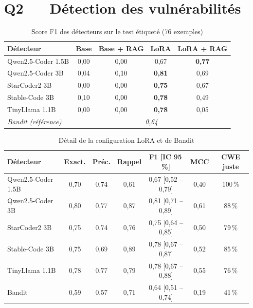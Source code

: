 \documentclass[11pt,a4paper,oneside]{report}
\begin{document}
\section{Q2 — Détection des vulnérabilités}
\begin{table}[H]
\centering
\caption{Score F1 des détecteurs sur le test étiqueté (76 exemples)}
\label{tab:f1}
\begin{tabular}{@{}lcccc@{}}
\toprule
\textbf{Détecteur} & \textbf{Base} & \textbf{Base + RAG} & \textbf{LoRA} & \textbf{LoRA + RAG} \\
\midrule
Qwen2.5-Coder 1.5B & 0,00 & 0,00 & 0,67 & \textbf{0,77} \\
Qwen2.5-Coder 3B & 0,04 & 0,10 & \textbf{0,81} & 0,69 \\
StarCoder2 3B & 0,00 & 0,00 & \textbf{0,75} & 0,67 \\
Stable-Code 3B & 0,10 & 0,00 & \textbf{0,78} & 0,49 \\
TinyLlama 1.1B & 0,00 & 0,00 & \textbf{0,78} & 0,05 \\
\midrule
\textit{Bandit (référence)} & \multicolumn{4}{c}{\textit{0,64}} \\
\bottomrule
\end{tabular}
\end{table}

\begin{table}[H]
\centering
\caption{Détail de la configuration LoRA et de Bandit}
\label{tab:lora}
\small
\begin{tabular}{@{}lcccccc@{}}
\toprule
\textbf{Détecteur} & \textbf{Exact.} & \textbf{Préc.} & \textbf{Rappel} & \textbf{F1 [IC 95\,\%]} & \textbf{MCC} & \textbf{CWE juste} \\
\midrule
Qwen2.5-Coder 1.5B & 0,70 & 0,74 & 0,61 & 0,67 [0,52 -- 0,79] & 0,40 & 100\,\% \\
Qwen2.5-Coder 3B & 0,80 & 0,77 & 0,87 & 0,81 [0,71 -- 0,89] & 0,61 & 88\,\% \\
StarCoder2 3B & 0,75 & 0,74 & 0,76 & 0,75 [0,64 -- 0,85] & 0,50 & 79\,\% \\
Stable-Code 3B & 0,75 & 0,69 & 0,89 & 0,78 [0,67 -- 0,87] & 0,52 & 85\,\% \\
TinyLlama 1.1B & 0,78 & 0,77 & 0,79 & 0,78 [0,67 -- 0,88] & 0,55 & 76\,\% \\
Bandit & 0,59 & 0,57 & 0,71 & 0,64 [0,51 -- 0,74] & 0,19 & 41\,\% \\
\bottomrule
\end{tabular}
\end{table}
\end{document}
